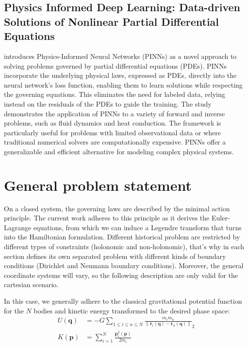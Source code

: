 \documentclass[draft]{agujournal2019}
\newcommand{\norm}[1]{\left\lVert#1\right\rVert}
\begin{document}
\subsection{Physics Informed Deep Learning: Data-driven Solutions of Nonlinear Partial Differential Equations}
\cite{raissi2017physicsinformeddeeplearning} introduces Physics-Informed Neural Networks (PINNs) as a novel approach to solving problems governed by partial differential equations (PDEs). PINNs incorporate the underlying physical laws, expressed as PDEs, directly into the neural network's loss function, enabling them to learn solutions while respecting the governing equations. This eliminates the need for labeled data, relying instead on the residuals of the PDEs to guide the training. The study demonstrates the application of PINNs to a variety of forward and inverse problems, such as fluid dynamics and heat conduction. The framework is particularly useful for problems with limited observational data or where traditional numerical solvers are computationally expensive. PINNs offer a generalizable and efficient alternative for modeling complex physical systems.

\section{General problem statement}
On a closed system, the governing laws are described by the minimal action principle. The current work adheres to this principle as it derives the Euler-Lagrange equations, from which we can induce a Legendre transform that turns into the Hamiltonian formulation. Different historical problem are restricted by different types of constraints (holonomic and non-holonomic), that's why in each section defines its own separated problem with different kinds of boundary conditions (Dirichlet and Neumann boundary conditions). Moreover, the general coordinate systems will vary, so the following description are only valid for the cartesian scenario.

In this case, we generally adhere to the classical gravitational potential function for the $N$ bodies and kinetic energy transformed to the desired phase space:
\begin{align*}
    U(\mathbf{q}) &= - G \sum_{1 \leq i \leq n \leq N} \frac{m_i m_n}{\norm{\mathbf{r}_i\left(\mathbf{q}\right) - \mathbf{r}_n\left(\mathbf{q}\right)}}_2 \\
    K(\mathbf{p}) &= \sum_{i = 1}^{N} \frac{\mathbf{p}_i^2\left(\mathbf{p}\right)}{2 m_i}
\end{align*}
\end{document}
